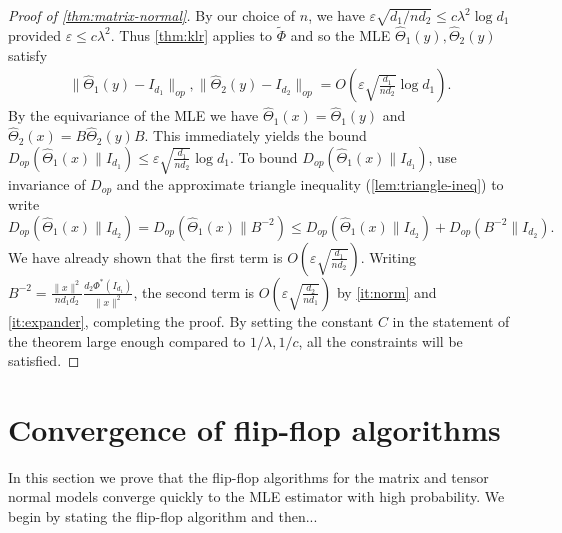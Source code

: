 \documentclass[aos]{imsart}
\theoremstyle{definition}
\numberwithin{equation}{section}
\newcommand{\htheta}{\widehat{\Theta}}
\newcommand{\eps}{\varepsilon}
\begin{document}
\begin{proof}[Proof of \cref{thm:matrix-normal}]
By our choice of $n$, we have $\eps \sqrt{d_1/nd_2} \leq c\lambda^2\log d_1$ provided $\eps \leq c\lambda^2$. Thus \cref{thm:klr} applies to $\tilde{\Phi}$ and so the MLE $\htheta_1(y), \htheta_2(y)$ satisfy
\begin{gather*} \| \htheta_1(y) - I_{d_1}\|_{op}, \| \htheta_2(y) - I_{d_2}\|_{op} = O\left(\eps \sqrt{\frac{d_1}{n d_2}} \log d_1\right).\end{gather*}
By the equivariance of the MLE we have $\htheta_1(x) = \htheta_1(y)$ and $\htheta_2(x) = B \htheta_2 (y) B$. This immediately yields the bound $ D_{op}(\htheta_1(x) \rVert I_{d_1}) \leq \eps \sqrt{\frac{d_1}{n d_2}} \log d_1.$
To bound $D_{op}(\htheta_1(x) \rVert I_{d_1})$, use invariance of $D_{op}$ and the approximate triangle inequality (\cref{lem:triangle-ineq}) to write
$$D_{op}(\htheta_1(x) \rVert I_{d_2}) = D_{op}(\htheta_1(x) \rVert B^{-2}) \leq D_{op}(\htheta_1(x)\rVert I_{d_2}) + D_{op}(B^{-2}\rVert I_{d_2}).$$
We have already shown that the first term is $O(\eps \sqrt{\frac{d_1}{n d_2}}).$ Writing $B^{-2} = \frac{\|x\|^2}{nd_1 d_2} \frac{d_2 \Phi^*(I_{d_1})}{\|x\|^2}$, the second term is $O(\eps \sqrt{\frac{d_2}{n d_1}})$ by \cref{it:norm} and \cref{it:expander}, completing the proof.  By setting the constant $C$ in the statement of the theorem large enough compared to $1/\lambda, 1/c$, all the constraints will be satisfied.
\end{proof}










\section{Convergence of flip-flop algorithms}
In this section we prove that the flip-flop algorithms for the matrix and tensor normal models converge quickly to the MLE estimator with high probability. We begin by stating the flip-flop algorithm and then...
\end{document}

